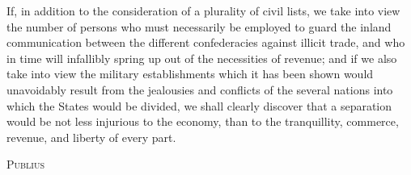 If, in addition to the consideration of a plurality of civil lists, we take into view the number of persons who must necessarily be employed to guard the inland communication between the different confederacies against illicit trade, and who in time will infallibly spring up out of the necessities of revenue; and if we also take into view the military establishments which it has been shown would unavoidably result from the jealousies and conflicts of the several nations into which the States would be divided, we shall clearly discover that a separation would be not less injurious to the economy, than to the tranquillity, commerce, revenue, and liberty of every part.

\vspace{.5cm}
\textsc{Publius}

\vspace{1.5cm}

